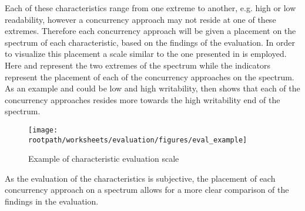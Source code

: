 Each of these characteristics range from one extreme to another, e.g. high or low readability, however a concurrency approach may not reside at one of these extremes. Therefore each concurrency approach will be given a placement on the spectrum of each characteristic, based on the findings of the evaluation. In order to visualize this placement a scale similar to the one presented in  is employed. Here  and  represent the two extremes of the spectrum while the indicators represent the placement of each of the concurrency approaches on the spectrum. As an example  and  could be low and high writability,  then shows that each of the concurrency approaches resides more towards the high writability end of the spectrum.
\begin{figure}[ht!]
\centering
\texttt{[image: \\rootpath/worksheets/evaluation/figures/eval\_example]}
\caption{Example of characteristic evaluation scale}\label{fig:evel_example}
\end{figure}
As the evaluation of the characteristics is subjective, the placement of each concurrency approach on a spectrum allows for a more clear comparison of the findings in the evaluation.
\worksheetend